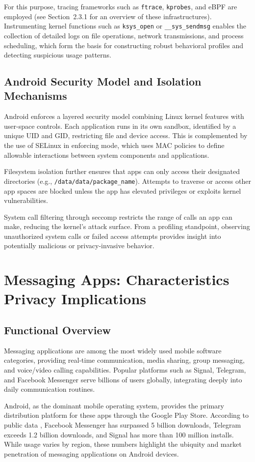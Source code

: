 \documentclass[a4paper,12pt]{report}
\begin{document}
For this purpose, tracing frameworks such as \texttt{ftrace}, \texttt{kprobes}, and eBPF are employed (see Section~2.3.1 for an overview of these infrastructures). Instrumenting kernel functions such as \texttt{ksys\_open} or \texttt{\_\_sys\_sendmsg} enables the collection of detailed logs on file operations, network transmissions, and process scheduling, which form the basis for constructing robust behavioral profiles and detecting suspicious usage patterns.
\subsection{ Android Security Model and Isolation Mechanisms}
Android enforces a layered security model combining Linux kernel features with user-space controls. Each application runs in its own sandbox, identified by a unique UID and GID, restricting file and device access. This is complemented by the use of SELinux in enforcing mode, which uses MAC policies to define allowable interactions between system components and applications.

Filesystem isolation further ensures that apps can only access their designated directories (e.g., \texttt{/data/data/{package\_name}}). Attempts to traverse or access other app spaces are blocked unless the app has elevated privileges or exploits kernel vulnerabilities.

System call filtering through seccomp restricts the range of calls an app can make, reducing the kernel's attack surface. From a profiling standpoint, observing unauthorized system calls or failed access attempts provides insight into potentially malicious or privacy-invasive behavior.

\section{Messaging Apps: Characteristics  Privacy Implications}

\subsection{Functional Overview}
Messaging applications are among the most widely used mobile software categories, providing real-time communication, media sharing, group messaging, and voice/video calling capabilities. Popular platforms such as Signal, Telegram, and Facebook Messenger serve billions of users globally, integrating deeply into daily communication routines.

Android, as the dominant mobile operating system, provides the primary distribution platform for these apps through the Google Play Store. According to public data \cite{statista2024messaging, googleplaydata2024}, Facebook Messenger has surpassed 5 billion downloads, Telegram exceeds 1.2 billion downloads, and Signal has more than 100 million installs. While usage varies by region, these numbers highlight the ubiquity and market penetration of messaging applications on Android devices.
\end{document}
